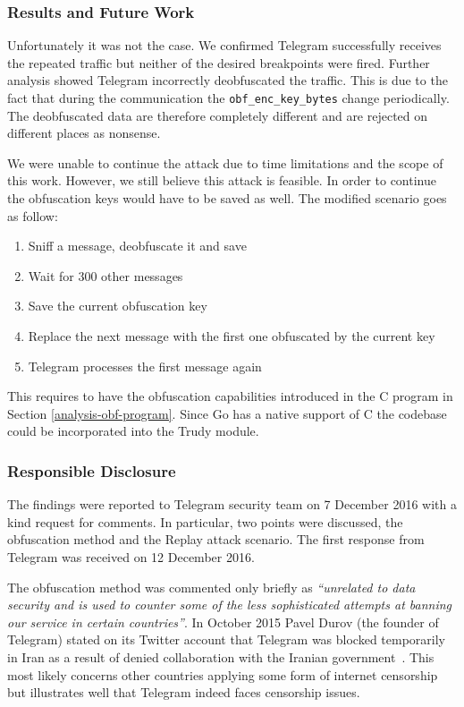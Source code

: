 \documentclass[thesis=M,english]{FITthesis}[2012/10/20]
\begin{document}
\subsubsection{Results and Future Work}

Unfortunately it was not the case. We confirmed Telegram successfully  receives the repeated traffic but neither of the desired breakpoints were fired. Further analysis showed Telegram incorrectly deobfuscated the traffic. This is due to the fact that during the communication the \texttt{obf\_enc\_key\_bytes} change periodically. The deobfuscated data are therefore completely different and are rejected on different places as nonsense.

We were unable to continue the attack due to time limitations and the scope of this work. However, we still believe this attack is feasible. In order to continue the obfuscation keys would have to be saved as well. The modified scenario goes as follow:

\begin{enumerate}
	\item Sniff a message, deobfuscate it and save
	\item Wait for 300 other messages
	\item Save the current obfuscation key
	\item Replace the next message with the first one obfuscated by the current key
	\item Telegram processes the first message again
\end{enumerate}

This requires to have the obfuscation capabilities introduced in the C program in Section \ref{analysis-obf-program}. Since Go has a native support of C the codebase could be incorporated into the Trudy module.


\subsubsection{Responsible Disclosure}

The findings were reported to Telegram security team on 7 December 2016 with a kind request for comments. In particular, two points were discussed, the obfuscation method and the Replay attack scenario. The first response from Telegram was received on 12 December 2016.

The obfuscation method was commented only briefly as \emph{``unrelated to data security and is used to counter some of the less sophisticated attempts at banning our service in certain countries''}. In October 2015 Pavel Durov (the founder of Telegram) stated on its Twitter account that Telegram was blocked temporarily in Iran as a result of denied collaboration with the Iranian government~\cite{telegram-durov-iran}. This most likely concerns other countries applying some form of internet censorship but illustrates well that Telegram indeed faces censorship issues.
\end{document}
